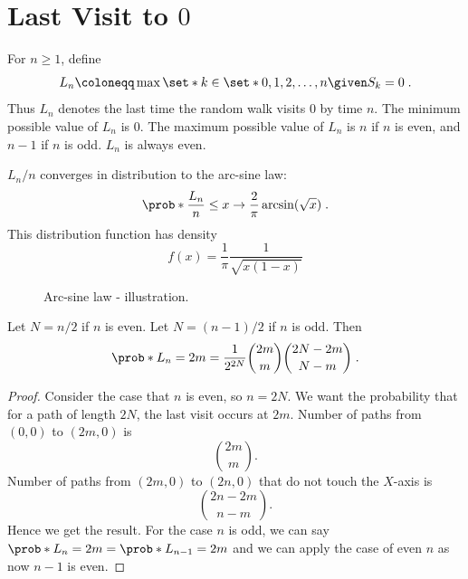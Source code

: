 \section{Last Visit to $0$}

For $n\geq 1$, define
\[
L_n \coloneqq \max\set*{ k \in\set*{0,1,2,\ldots,n} \given S_k = 0}\;.
\]
Thus $L_n$ denotes the last time the random walk visits $0$ by time $n$. The minimum possible value of $L_n$ is $0$. The maximum possible value of $L_n$ is $n$ if $n$ is even, and $n-1$ if $n$ is odd. $L_n$ is always even.


\begin{theorem}\label{thm:arcsinelaw}
$L_n/n$ converges in distribution to the arc-sine law:
\[
\prob*{\frac{L_n}{n}\leq x}\to\frac{2}{\pi}\arcsin(\sqrt{x})\;.
\]
This distribution function has density
\[
f(x)=\frac{1}{\pi}\frac{1}{\sqrt{x(1-x)}}
\]
\end{theorem}

\begin{figure}[h]
\centering
\caption{Arc-sine law - illustration.}
\label{fig:arc-sine-law-illustration}
\end{figure}




\begin{proposition}    
Let $N=n/2$ if $n$ is even. Let $N=(n-1)/2$ if $n$ is odd. Then
\[
\prob*{L_n=2m} = \frac{1}{2^{2N}}\binom{2m}{m}\binom{2N-2m}{N-m}\;.
\]    
\end{proposition}

\begin{proof}
Consider the case that $n$ is even, so $n=2N$.
We want the probability that for a path of length $2N$,
the last visit occurs at $2m$. Number of paths from $(0,0)$ to $(2m,0)$ is 
\[
\binom{2m}{m}.
\]
Number of paths from $(2m,0)$ to $(2n,0)$ that do not touch the $X$-axis is
\[
\binom{2n-2m}{n-m}.
\]
Hence we get the result. For the case $n$ is odd, we can say $\prob*{L_n=2m}=\prob*{L_{n-1}=2m}$ and we can apply the case of even $n$ as now $n-1$ is even.
\end{proof}


